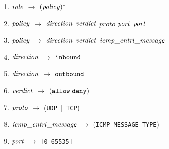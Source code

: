 \begin{enumerate}
\item \noindent ${\it role}$ $\rightarrow$ $({\it policy})^{*}$ \\
\item ${\it policy}$ $\rightarrow$ ${\it direction}$ ${\it verdict}$ ${proto}$ ${\it port}$ ${\it port}$ \\ 
\item ${\it policy}$ $\rightarrow$ ${\it direction}$ ${\it verdict}$ ${\it icmp\_cntrl\_message}$ \\ 
\item ${\it direction}$ $\rightarrow$ ${\tt inbound}$ \\ 
\item ${\it direction}$ $\rightarrow$ ${\tt outbound}$ \\ 
\item ${\it verdict}$ $\rightarrow$ $({\tt allow}|{\tt deny})$ \\ 
\item ${\it proto}$ $\rightarrow$ ({\tt UDP $ | $ TCP}) \\ 
\item ${\it icmp\_cntrl\_message}$ $\rightarrow$ ({\tt ICMP\_MESSAGE\_TYPE}) \\ 
\item ${\it port}$ $\rightarrow$ {\tt [0-65535]}\\
\end{enumerate}